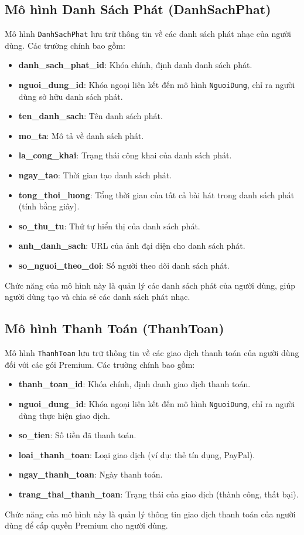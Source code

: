 \subsection{Mô hình Danh Sách Phát (DanhSachPhat)}
Mô hình \texttt{DanhSachPhat} lưu trữ thông tin về các danh sách phát nhạc của người dùng. Các trường chính bao gồm:
\begin{itemize}
    \item \textbf{danh\_sach\_phat\_id}: Khóa chính, định danh danh sách phát.
    \item \textbf{nguoi\_dung\_id}: Khóa ngoại liên kết đến mô hình \texttt{NguoiDung}, chỉ ra người dùng sở hữu danh sách phát.
    \item \textbf{ten\_danh\_sach}: Tên danh sách phát.
    \item \textbf{mo\_ta}: Mô tả về danh sách phát.
    \item \textbf{la\_cong\_khai}: Trạng thái công khai của danh sách phát.
    \item \textbf{ngay\_tao}: Thời gian tạo danh sách phát.
    \item \textbf{tong\_thoi\_luong}: Tổng thời gian của tất cả bài hát trong danh sách phát (tính bằng giây).
    \item \textbf{so\_thu\_tu}: Thứ tự hiển thị của danh sách phát.
    \item \textbf{anh\_danh\_sach}: URL của ảnh đại diện cho danh sách phát.
    \item \textbf{so\_nguoi\_theo\_doi}: Số người theo dõi danh sách phát.
\end{itemize}

Chức năng của mô hình này là quản lý các danh sách phát của người dùng, giúp người dùng tạo và chia sẻ các danh sách phát nhạc.

\subsection{Mô hình Thanh Toán (ThanhToan)}
Mô hình \texttt{ThanhToan} lưu trữ thông tin về các giao dịch thanh toán của người dùng đối với các gói Premium. Các trường chính bao gồm:
\begin{itemize}
    \item \textbf{thanh\_toan\_id}: Khóa chính, định danh giao dịch thanh toán.
    \item \textbf{nguoi\_dung\_id}: Khóa ngoại liên kết đến mô hình \texttt{NguoiDung}, chỉ ra người dùng thực hiện giao dịch.
    \item \textbf{so\_tien}: Số tiền đã thanh toán.
    \item \textbf{loai\_thanh\_toan}: Loại giao dịch (ví dụ: thẻ tín dụng, PayPal).
    \item \textbf{ngay\_thanh\_toan}: Ngày thanh toán.
    \item \textbf{trang\_thai\_thanh\_toan}: Trạng thái của giao dịch (thành công, thất bại).
\end{itemize}

Chức năng của mô hình này là quản lý thông tin giao dịch thanh toán của người dùng để cấp quyền Premium cho người dùng.
